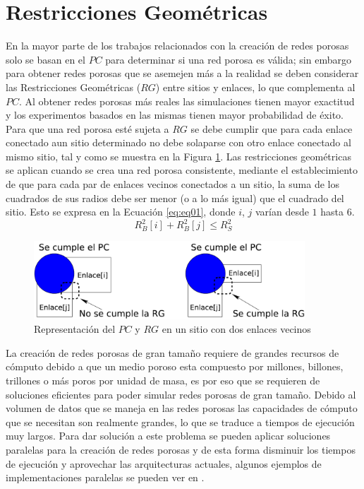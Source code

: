 \section{Restricciones Geométricas}
\label{sec:mgr}

En la mayor parte de los trabajos relacionados con la creación de redes porosas solo se basan en el $PC$ para determinar si una red porosa es válida; sin embargo para obtener redes porosas que se asemejen más a la realidad se deben considerar las Restricciones Geométricas ($RG$) entre sitios y enlaces, lo que complementa al $PC$. Al obtener redes porosas más reales las simulaciones tienen mayor exactitud y los experimentos basados en las mismas tienen mayor probabilidad de éxito.\\

Para que una red porosa est\'e sujeta a $RG$ se debe cumplir que para cada enlace conectado aun sitio determinado no debe solaparse con otro enlace conectado al mismo sitio, tal y como se muestra en la Figura \ref{fig:CPyGR}. Las restricciones geométricas se aplican cuando se crea una red porosa consistente, mediante el establecimiento de que para cada par de enlaces vecinos conectados a un sitio, la suma de los cuadrados de sus radios debe ser menor (o a lo más igual) que el cuadrado del sitio. Esto se expresa en la Ecuación \ref{eq:eq01}, donde $i$, $j$ varían desde $1$ hasta $6$.\\

\begin{equation}
R_{B}^2[i]+R_{B}^2[j] \leq R_{S}^2
\label{eq:eq01}
\end{equation}

\begin{figure}[hbtp]
\centering
\includegraphics[width=4.0in]{img/CPyGC_es.pdf}
\caption{Representación del $PC$ y $RG$ en un sitio con dos enlaces vecinos}
\label{fig:CPyGR}
\end{figure}

La creación de redes porosas de gran tamaño requiere de grandes recursos de cómputo debido a que un medio poroso esta compuesto por millones, billones, trillones o más poros por unidad de masa, es por eso que se requieren de soluciones eficientes  para poder simular redes porosas de gran tamaño. Debido al volumen de datos que se maneja en las redes porosas las capacidades de cómputo que se necesitan son realmente grandes, lo que se traduce a tiempos de ejecución muy largos. Para dar solución a este problema se pueden aplicar soluciones paralelas para la creación de redes porosas y de esta forma disminuir los tiempos de ejecución y aprovechar las arquitecturas actuales, algunos ejemplos de implementaciones paralelas se pueden ver en \cite{ref4}.\\

